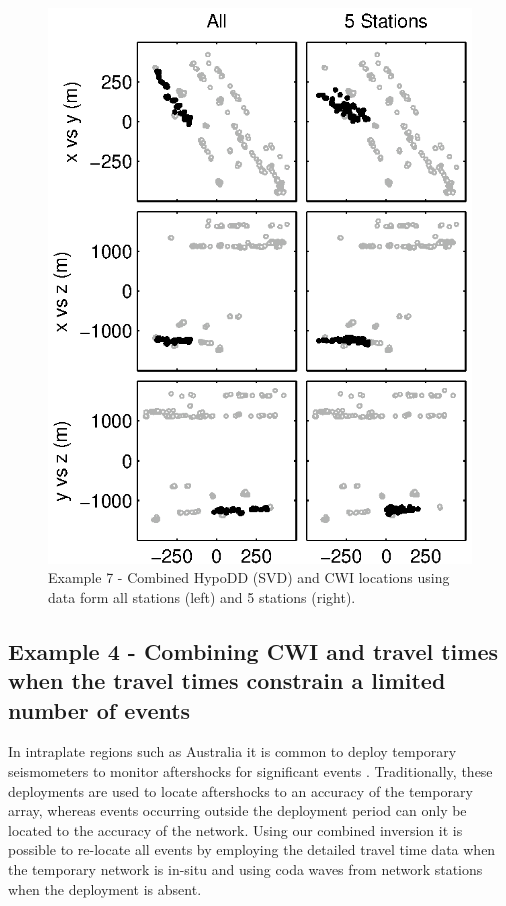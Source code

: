 \documentclass[extra, onecolumn, doublespacing]{gji}
\begin{document}
\begin{figure}
\includegraphics{diags/CalaverasLoc5_hypoDD_SVD.eps}
\caption{Example 7 - Combined HypoDD (SVD) and CWI locations using
data form all stations (left) and 5 stations (right).}
\label{fig-68Calaverasevents_ttandcoda1}
\end{figure}




\subsection{Example 4 - Combining CWI and travel times when the travel times constrain a limited number of events}


In intraplate regions such as Australia it is common to deploy
temporary seismometers to monitor aftershocks for significant events
\citep{dr_Bowman90a, dr_Leonard02a}. Traditionally, these
deployments are used to locate aftershocks to an accuracy of the
temporary array, whereas events occurring outside the deployment
period can only be located to the accuracy of the network. Using our
combined inversion it is possible to re-locate all events by
employing the detailed travel time data when the temporary network
is in-situ and using coda waves from network stations when the
deployment is absent.
\end{document}
